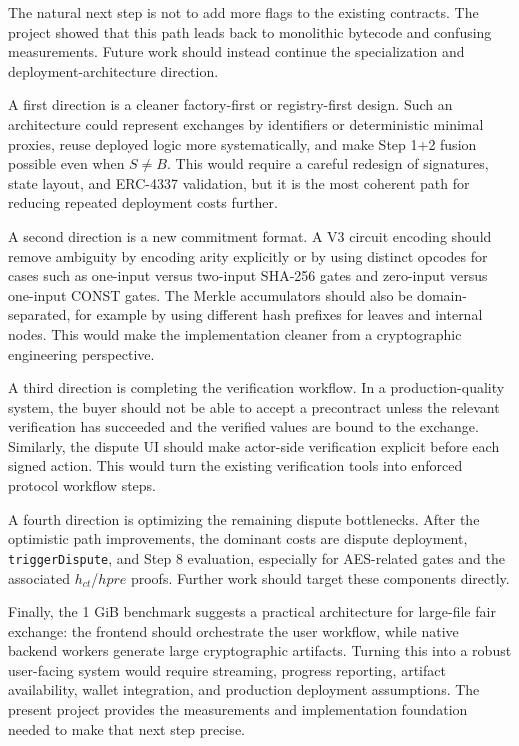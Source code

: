 The natural next step is not to add more flags to the existing contracts. The project
showed that this path leads back to monolithic bytecode and confusing measurements. Future
work should instead continue the specialization and deployment-architecture direction.

A first direction is a cleaner factory-first or registry-first design. Such an architecture
could represent exchanges by identifiers or deterministic minimal proxies, reuse deployed
logic more systematically, and make Step 1+2 fusion possible even when \(S \neq B\). This
would require a careful redesign of signatures, state layout, and ERC-4337 validation, but
it is the most coherent path for reducing repeated deployment costs further.

A second direction is a new commitment format. A V3 circuit encoding should remove
ambiguity by encoding arity explicitly or by using distinct opcodes for cases such as
one-input versus two-input SHA-256 gates and zero-input versus one-input CONST gates. The
Merkle accumulators should also be domain-separated, for example by using different hash
prefixes for leaves and internal nodes. This would make the implementation cleaner from a
cryptographic engineering perspective.

A third direction is completing the verification workflow. In a production-quality system,
the buyer should not be able to accept a precontract unless the relevant verification has
succeeded and the verified values are bound to the exchange. Similarly, the dispute UI
should make actor-side verification explicit before each signed action. This would turn the
existing verification tools into enforced protocol workflow steps.

A fourth direction is optimizing the remaining dispute bottlenecks. After the optimistic
path improvements, the dominant costs are dispute deployment, \texttt{triggerDispute}, and
Step 8 evaluation, especially for AES-related gates and the associated
\(h_{\mathit{ct}}\)/\(hpre\) proofs. Further work should target these components directly.

Finally, the 1 GiB benchmark suggests a practical architecture for large-file fair exchange:
the frontend should orchestrate the user workflow, while native backend workers generate
large cryptographic artifacts. Turning this into a robust user-facing system would require
streaming, progress reporting, artifact availability, wallet integration, and production
deployment assumptions. The present project provides the measurements and implementation
foundation needed to make that next step precise.
